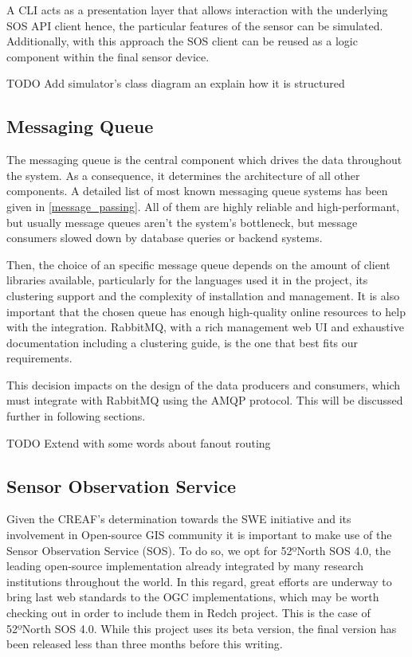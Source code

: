 A CLI acts as a presentation layer that allows interaction with the underlying SOS API client hence, the particular features of the sensor can be simulated. Additionally, with this approach the SOS client can be reused as a logic component within the final sensor device.

TODO Add simulator's class diagram an explain how it is structured

\subsection{Messaging Queue}

The messaging queue is the central component which drives the data throughout the system. As a consequence, it determines the architecture of all other components. A detailed list of most known messaging queue systems has been given in \ref{message_passing}. All of them are highly reliable and high-performant, but usually message queues aren't the system's bottleneck, but message consumers slowed down by database queries or backend systems.

Then, the choice of an specific message queue depends on the amount of client libraries available, particularly for the languages used it in the project, its clustering support and the complexity of installation and management. It is also important that the chosen queue has enough high-quality online resources to help with the integration. RabbitMQ, with a rich management web UI and exhaustive documentation including a clustering guide, is the one that best fits our requirements.

This decision impacts on the design of the data producers and consumers, which must integrate with RabbitMQ using the AMQP protocol. This will be discussed further in following sections.

TODO Extend with some words about fanout routing

\subsection{Sensor Observation Service}

Given the CREAF's determination towards the SWE initiative and its involvement in Open-source GIS community it is important to make use of the Sensor Observation Service (SOS). To do so, we opt for 52ºNorth SOS 4.0, the leading open-source implementation already integrated by many research institutions throughout the world. In this regard, great efforts are underway to bring last web standards to the OGC implementations, which may be worth checking out in order to include them in Redch project. This is the case of 52ºNorth SOS 4.0. While this project uses its beta version, the final version has been released less than three months before this writing.

